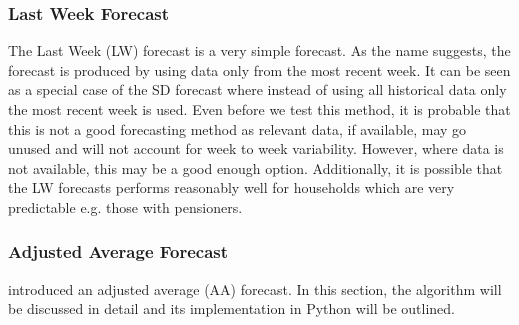 \documentclass[a4paper]{article}
\begin{document}
\subsubsection{Last Week Forecast} \label{subsubsec:lwforecast}
The Last Week (LW) forecast is a very simple forecast. As the name suggests, the forecast is produced by using data only from the most recent week. It can be seen as a special case of the SD forecast where instead of using all historical data only the most recent week is used. Even before we test this method, it is probable that this is not a good forecasting method as relevant data, if available, may go unused and will not account for week to week variability. However, where data is not available, this may be a good enough option. Additionally, it is possible that the LW forecasts performs reasonably well for households which are very predictable e.g. those with pensioners.

\subsubsection{Adjusted Average Forecast} \label{subsubsec:AAforecast}
\cite{dan14} introduced an adjusted average (AA) forecast. In this section, the algorithm will be discussed in detail and its implementation in Python will be outlined.
\end{document}
